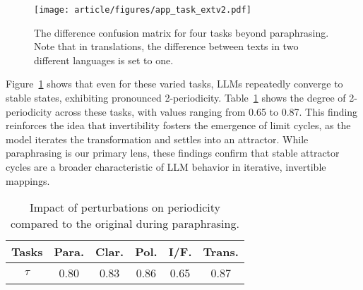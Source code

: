 \begin{figure}
\centering
\texttt{[image: article/figures/app\_task\_extv2.pdf]}
\caption{The difference confusion matrix for four tasks beyond paraphrasing. 
Note that in translations, the difference between texts in two different languages is set to one.}
\label{figs:task_extensions}
\end{figure}


Figure~\ref{figs:task_extensions} shows that even for these varied tasks, LLMs repeatedly converge to stable states, exhibiting pronounced 2-periodicity. 
Table~\ref{table:task_extension} shows the degree of 2-periodicity across these tasks, with values ranging from 0.65 to 0.87. 
This finding reinforces the idea that invertibility fosters the emergence of limit cycles, as the model iterates the transformation and settles into an attractor. 
While paraphrasing is our primary lens, these findings confirm that stable attractor cycles are a broader characteristic of LLM behavior in iterative, invertible mappings.



\begin{table}[!h]
    \centering
    \small
    \begin{tabular}{cccccc}
        \toprule
        \textbf{Tasks}& \textbf{Para.} & \textbf{Clar.} &\textbf{Pol.} & \textbf{I/F.} & \textbf{Trans.} \\
        \midrule
        \textbf{$\tau$} &0.80 & 0.83 &  0.86 & 0.65 & 0.87 \\
        \bottomrule
    \end{tabular}
    \caption{Impact of perturbations on periodicity compared to the original during paraphrasing.}
    \label{table:task_extension}
\end{table}





